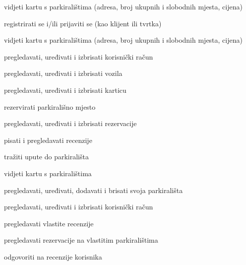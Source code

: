 \begin{packed_enum}
	\item  {}
	
	\begin{packed_enum}
		
		\item vidjeti kartu s parkiralištima (adresa, broj ukupnih i slobodnih mjesta, cijena)
		\item registrirati se i/ili prijaviti se (kao klijent ili tvrtka)
		
	\end{packed_enum}
	
	\item  {}
	
	\begin{packed_enum}
		
		\item vidjeti kartu s parkiralištima (adresa, broj ukupnih i slobodnih mjesta, cijena)
		\item pregledavati, uređivati i izbrisati korisnički račun
		\item pregledavati, uređivati i izbrisati vozila
		\item pregledavati, uređivati i izbrisati karticu
		\item rezervirati parkirališno mjesto
		\item pregledavati, uređivati i izbrisati rezervacije
		\item pisati i pregledavati  recenzije
		\item tražiti upute do parkirališta
		
	\end{packed_enum}
	
	
	\item  {}
	
	\begin{packed_enum}
		
		\item vidjeti kartu s parkiralištima
		\item pregledavati, uređivati, dodavati i brisati svoja parkirališta
		\item pregledavati, uređivati i izbrisati korisnički račun
		\item pregledavati vlastite recenzije
		\item pregledavati rezervacije na vlastitim parkiralištima
		\item odgovoriti na recenzije korisnika
		

\end{packed_enum}
\end{packed_enum}
